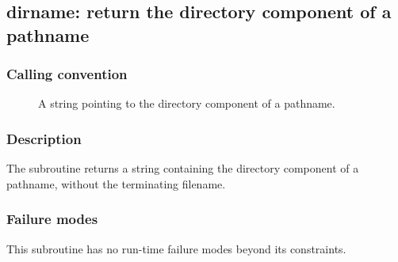 \clearpage
{}
{}
\label{subr:dirname}
\subsection*{dirname: return the directory component of a pathname}

\subsubsection*{Calling convention}

\begin{description}
\item[] A string pointing to the directory component of
  a pathname.
\end{description}

\subsubsection*{Description}

The  subroutine returns a string containing the
directory component of a pathname, without the terminating filename.

\subsubsection*{Failure modes}

This subroutine has no run-time failure modes beyond its constraints.
